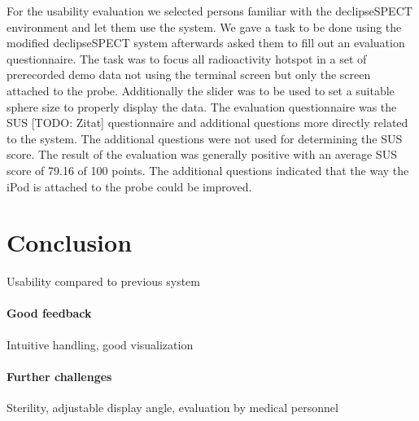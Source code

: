 \documentclass{scrartcl}
\begin{document}
For the usability evaluation we selected persons familiar with the declipseSPECT environment and let them use the system. We gave a task to be done using the modified declipseSPECT system afterwards asked them to fill out an evaluation questionnaire.
The task was to focus all radioactivity hotspot in a set of prerecorded demo data not using the terminal screen but only the screen attached to the probe. Additionally the slider was to be used to set a suitable sphere size to properly display the data. The evaluation questionnaire was the SUS [TODO: Zitat] questionnaire and additional questions more directly related to the system. The additional questions were not used for determining the SUS score.
The result of the evaluation was generally positive with an average SUS score of 79.16 of 100 points. The additional questions indicated that the way the iPod is attached to the probe could be improved.



\section{Conclusion}
Usability compared to previous system
\paragraph*{Good feedback}
Intuitive handling, good visualization
\paragraph*{Further challenges}
Sterility, adjustable display angle, evaluation by medical personnel




\end{document}
